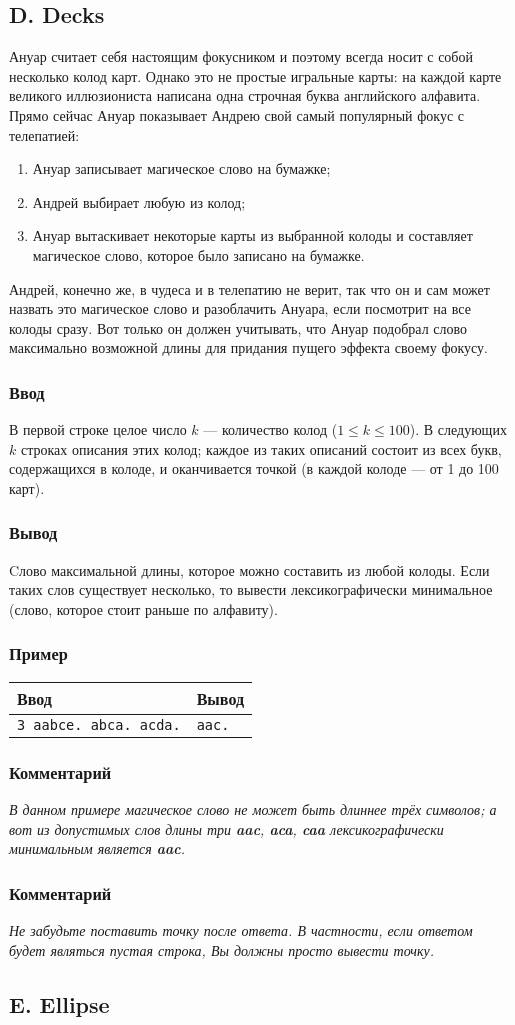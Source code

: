 \documentclass[10pt, a4paper]{article}
\newcommand{\informat}[1]
{
	\subsubsection*{Ввод} #1
}
\newcommand{\outformat}[1]
{
	\subsubsection*{Вывод} #1
}
\newcommand{\example}[2]
{
	\subsubsection*{Пример}
	\noindent
	\begin{center}
	\begin{tabularx}{\linewidth}{|X|X|}
	\hline
	Ввод & Вывод \\
	\hline
	{\tt #1} & {\tt #2}		\\
	\hline
	\end{tabularx}
	\end{center}
}
\newcommand{\excomm}[1]
{
	\subsubsection*{Комментарий}
	\textit{#1}
}
\begin{document}
\subsection*{D. Decks}

Ануар считает себя настоящим фокусником и поэтому всегда носит с собой несколько колод карт. Однако это не простые игральные карты: на каждой карте великого иллюзиониста написана одна строчная буква английского алфавита. Прямо сейчас Ануар показывает Андрею свой самый популярный фокус с телепатией:
\begin{enumerate}
\item Ануар записывает магическое слово на бумажке;
\item Андрей выбирает любую из колод;
\item Ануар вытаскивает некоторые карты из выбранной колоды и составляет магическое слово, которое было записано на бумажке. 
\end{enumerate}
Андрей, конечно же, в чудеса и в телепатию не верит, так что он и сам может назвать это магическое слово и разоблачить Ануара, если посмотрит на все колоды сразу. Вот только он должен учитывать, что Ануар подобрал слово максимально возможной длины для придания пущего эффекта своему фокусу.

\informat{В первой строке целое число $k$ --- количество колод ($1 \le k \le 100$). В следующих $k$ строках описания этих колод; каждое из таких описаний состоит из всех букв, содержащихся в колоде, и оканчивается точкой (в каждой колоде --- от 1 до 100 карт).}

\outformat{Cлово максимальной длины, которое можно составить из любой колоды. Если таких слов существует несколько, то вывести лексикографически минимальное (слово, которое стоит раньше по алфавиту).}

\example{3 \newline aabce. \newline abca. \newline acda.}{aac.}

\excomm{В данном примере магическое слово не может быть длиннее трёх символов; а вот из допустимых слов длины три \textbf{aac}, \textbf{aca}, \textbf{caa} лексикографически минимальным является \textbf{aac}.}

\excomm{Не забудьте поставить точку после ответа. В частности, если ответом будет являться пустая строка, Вы должны просто вывести точку.}



\subsection*{E. Ellipse}
\end{document}
